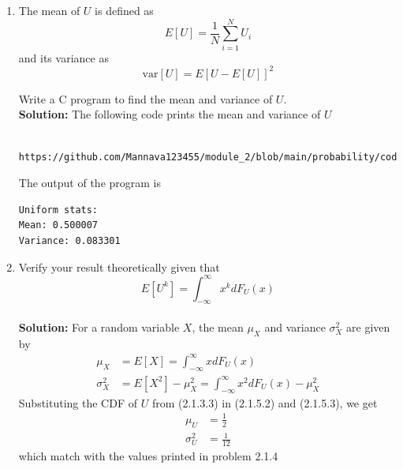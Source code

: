 \documentclass[journal,10pt,twocolumn]{IEEEtran}
\providecommand{\sbrak}[1]{\ensuremath{{}\left[#1\right]}}
\newcommand{\solution}{\noindent \textbf{Solution: }}
\begin{document}
\begin{enumerate}
\item
\label{prob:print_uni}
The mean of $U$ is defined as
%
\begin{equation}
E\sbrak{U} = \frac{1}{N}\sum_{i=1}^{N}U_i
\end{equation}
%
and its variance as
%
\begin{equation}
\text{var}\sbrak{U} = E\sbrak{U- E\sbrak{U}}^2 
\end{equation}

Write a C program to  find the mean and variance of $U$.\\
\solution The following code prints the mean and variance of $U$
\begin{lstlisting}
	https://github.com/Mannava123455/module_2/blob/main/probability/codes/chapter_2/2_1_1.c
\end{lstlisting}
The output of the program is
\begin{lstlisting}
Uniform stats:
Mean: 0.500007
Variance: 0.083301
\end{lstlisting}

\item Verify your result theoretically given that
%
\begin{equation}
E\sbrak{U^k} = \int_{-\infty}^{\infty}x^kdF_{U}(x)
\end{equation}\\
\solution For a random variable $X$, the mean $\mu_X$ and variance $\sigma_X^2$ are given by
\begin{align}
	\label{eq:mean_exp}
	\mu_X &= E\sbrak{X} = \int_{-\infty}^{\infty}xdF_{U}(x) \\
	\label{eq:var_exp}
	\sigma_X^2 &= E\sbrak{X^2} - \mu_X^2 = \int_{-\infty}^{\infty}x^2dF_{U}(x) - \mu_X^2
\end{align}  
Substituting the CDF of $U$ from (2.1.3.3) in (2.1.5.2) and (2.1.5.3), we get
\begin{align}
	\label{eq:mean_uni}
	\mu_U &= \frac{1}{2} \\
	\label{eq:var_uni}
	\sigma_U^2 &= \frac{1}{12}
\end{align}  
which match with the values printed in problem 2.1.4
\end{enumerate}
\end{document}
